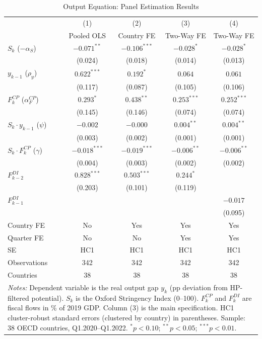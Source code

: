 \documentclass[12pt, a4paper]{article}
\begin{document}
\label{sec:results}
\begin{table}[htbp]
\centering
\caption{Output Equation: Panel Estimation Results}
\label{tab:output_equation}
\small
\begin{tabular}{lcccc}
\toprule
 & (1) & (2) & (3) & (4) \\
 & Pooled OLS & Country FE & Two-Way FE & Two-Way FE \\
\midrule
$S_k$ ($-\alpha_S$)
  & $-0.071^{**}$  & $-0.106^{***}$ & $-0.028^{*}$   & $-0.028^{*}$   \\
  & (0.024)        & (0.018)        & (0.014)        & (0.013)        \\[4pt]
$y_{k-1}$ ($\rho_y$)
  & $0.622^{***}$  & $0.192^{*}$    & $0.064$        & $0.061$        \\
  & (0.117)        & (0.087)        & (0.105)        & (0.106)        \\[4pt]
$F^{CP}_k$ ($\alpha^{CP}_F$)
  & $0.293^{*}$    & $0.438^{**}$   & $0.253^{***}$  & $0.252^{***}$  \\
  & (0.145)        & (0.146)        & (0.074)        & (0.074)        \\[4pt]
$S_k \cdot y_{k-1}$ ($\psi$)
  & $-0.002$       & $-0.000$       & $0.004^{**}$   & $0.004^{**}$   \\
  & (0.003)        & (0.002)        & (0.001)        & (0.001)        \\[4pt]
$S_k \cdot F^{CP}_k$ ($\gamma$)
  & $-0.018^{***}$ & $-0.019^{***}$ & $-0.006^{**}$  & $-0.006^{**}$  \\
  & (0.004)        & (0.003)        & (0.002)        & (0.002)        \\[4pt]
$F^{DI}_{k-2}$
  & $0.828^{***}$  & $0.503^{***}$  & $0.244^{*}$    &                \\
  & (0.203)        & (0.101)        & (0.119)        &                \\[4pt]
$F^{DI}_{k-1}$
  &                &                &                & $-0.017$       \\
  &                &                &                & (0.095)        \\[4pt]
\midrule
Country FE       & No  & Yes & Yes & Yes \\
Quarter FE       & No  & No  & Yes & Yes \\
SE               & HC1 & HC1 & HC1 & HC1 \\
Observations     & 342 & 342 & 342 & 342 \\
Countries        & 38  & 38  & 38  & 38  \\
\bottomrule
\multicolumn{5}{p{12cm}}{\footnotesize \textit{Notes:} Dependent variable is the real output gap $y_k$ (pp deviation from HP-filtered potential). $S_k$ is the Oxford Stringency Index (0--100). $F^{CP}_k$ and $F^{DI}_k$ are fiscal flows in \% of 2019 GDP. Column (3) is the main specification. HC1 cluster-robust standard errors (clustered by country) in parentheses. Sample: 38 OECD countries, Q1.2020--Q1.2022. $^{*}p<0.10$; $^{**}p<0.05$; $^{***}p<0.01$.} \\
\end{tabular}
\end{table}
\end{document}

